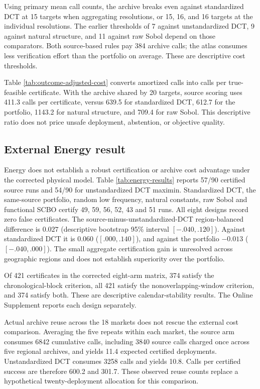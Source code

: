 Using primary mean call counts, the archive breaks even against standardized
DCT at 15 targets when aggregating resolutions, or 15, 16, and 16 targets
at the individual resolutions.  The earlier thresholds of 7 against
unstandardized DCT, 9 against natural structure, and 11 against raw Sobol
depend on those comparators.  Both source-based rules pay 384 archive calls;
the atlas consumes less verification effort than the portfolio on average.
These are descriptive cost thresholds.

Table \ref{tab:outcome-adjusted-cost} converts amortized calls into calls per
true-feasible certificate.  With the archive shared by 20 targets, source
scoring uses 411.3 calls per certificate, versus 639.5 for standardized DCT,
612.7 for the portfolio, 1143.2 for natural structure, and 709.4 for raw
Sobol.  This descriptive ratio
does not price unsafe deployment, abstention, or objective quality.


\subsection{External Energy result}

Energy does not establish a robust certification or archive cost advantage
under the corrected physical model.  Table \ref{tab:energy-results} reports
57/90 certified source runs and 54/90 for unstandardized DCT maximin.  Standardized DCT, the
same-source portfolio, random low frequency, natural constants, raw Sobol
and functional SCBO certify 49, 59, 56, 52, 43 and 51 runs.  All eight designs
record zero false certificates.  The source-minus-unstandardized-DCT
region-balanced difference is $0.027$ (descriptive bootstrap 95\%
interval $[-.040,.120]$).  Against standardized DCT it is 0.060
($[.000,.140]$), and against the portfolio $-0.013$ ($[-.040,.000]$).
The small aggregate certification gain is unresolved across geographic
regions and does not establish superiority over the portfolio.

Of 421 certificates in the corrected eight-arm matrix, 374 satisfy the
chronological-block criterion, all 421 satisfy the nonoverlapping-window
criterion, and 374 satisfy both.  These are descriptive calendar-stability
results.  The Online Supplement reports each design separately.

Actual archive reuse across the 18 markets does not rescue the external
cost comparison.  Averaging the five repeats within each market, the source
arm consumes 6842 cumulative calls, including 3840 source calls charged once
across five regional archives, and yields 11.4 expected certified deployments.
Unstandardized DCT consumes 3258 calls and yields 10.8.  Calls per certified
success are therefore 600.2 and 301.7.  These observed reuse counts replace a
hypothetical twenty-deployment allocation for this comparison.

